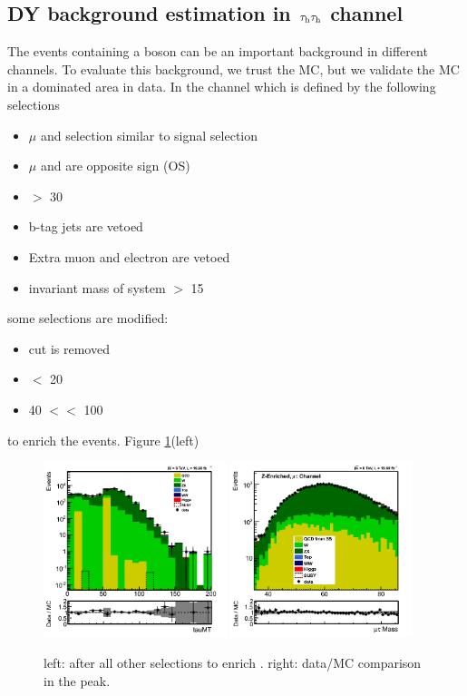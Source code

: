 \subsection{\texorpdfstring{DY background estimation in $\tau_{\rm h}\tau_{\rm h}$ channel}{DY background estimation in tau-tau channel}}
The events containing a \Z boson can be an important background in different channels. To evaluate this background, we trust 
the MC, but we validate the MC in a \Z dominated area in data. In the \muTau channel which is defined by the following selections 
\begin{itemize}
\item $\mu$ and \Tau selection similar to signal selection
\item $\mu$ and \Tau are opposite sign (OS)
\item \MPT $>$ 30 
\item b-tag jets are vetoed
\item Extra muon and electron are vetoed 
\item invariant mass of \muTau system $>$ 15 \GeV
\end{itemize}
some selections are modified:
\begin{itemize}
\item \mindphifour cut is removed
\item \mttwo $<$ 20 \GeV
\item 40 $<$\tauMT $<$ 100 \GeV
\end{itemize}
to enrich the \Z events. Figure \ref{fig:ZValidation}(left)
\begin{figure}[h]
\centering
\includegraphics[width=0.475\textwidth,keepaspectratio=true]{ZValidation/tauMT_ZValidation.png}
\includegraphics[width=0.475\textwidth,keepaspectratio=true]{ZValidation/InvMass_ZValidation.png}
\caption{left: \tauMT after all other selections to enrich \Z. right: data/MC comparison in the \Z peak.}
\label{fig:ZValidation}
\end{figure}
